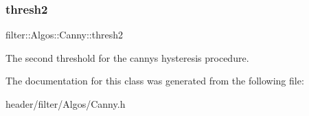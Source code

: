 \subsubsection{\texorpdfstring{thresh2}{thresh2}}
{\footnotesize\ttfamily filter\+::\+Algos\+::\+Canny\+::thresh2}

The second threshold for the canny\textquotesingle{}s hysteresis procedure. 

The documentation for this class was generated from the following file\+:\begin{DoxyCompactItemize}
\item 
header/filter/\+Algos/Canny.\+h\end{DoxyCompactItemize}
